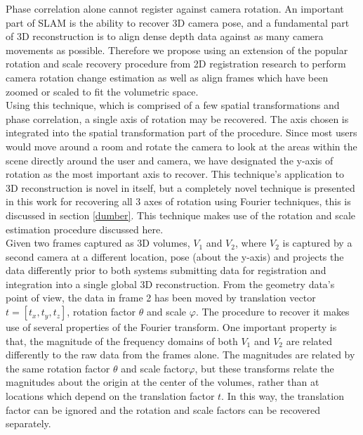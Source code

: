 Phase correlation alone cannot register against camera rotation. An important part of SLAM is the ability to recover 3D camera pose, and a fundamental part of 3D reconstruction is to align dense depth data against as many camera movements as possible. Therefore we propose using an extension of the popular rotation and scale recovery procedure from 2D registration research to perform camera rotation change estimation as well as align frames which have been zoomed or scaled to fit the volumetric space. \\

Using this technique, which is comprised of a few spatial transformations and phase correlation, a single axis of rotation may be recovered. The axis chosen is integrated into the spatial transformation part of the procedure. Since most users would move around a room and rotate the camera to look at the areas within the scene directly around the user and camera, we have designated the y-axis of rotation as the most important axis to recover. This technique's application to 3D reconstruction is novel in itself, but a completely novel technique is presented in this work for recovering all 3 axes of rotation using Fourier techniques, this is discussed in section \ref{dumber}. This technique makes use of the rotation and scale estimation procedure discussed here.  \\


Given two frames captured as 3D volumes, $V_1$ and $V_2$, where $V_2$ is captured by a second camera at a different location, pose (about the y-axis) and projects the data differently prior to both systems submitting data for registration and integration into a single global 3D reconstruction. From the geometry data's point of view, the data in frame 2 has been moved by translation vector $t = [t_x, t_y, t_z]$, rotation factor $\theta$ and scale $\varphi$. The procedure to recover it makes use of several properties of  the Fourier transform. One important property is that, the magnitude of the frequency domains of both $V_1$ and $V_2$ are related differently to the raw data from the frames alone. The magnitudes are related by the same rotation factor $\theta$ and scale factor$\varphi$, but these transforms relate the magnitudes about the origin at the center of the volumes, rather than at locations which depend on the translation factor $t$. In this way, the translation factor can be ignored and the rotation and scale factors can be recovered separately. \\


